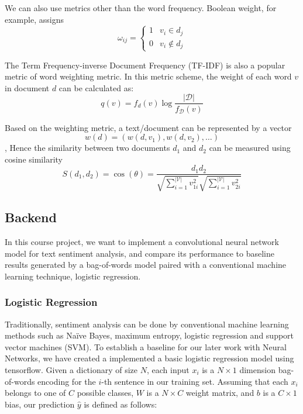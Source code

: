 \documentclass[conference]{IEEEtran}
\begin{document}
    We can also use metrics other than the word frequency. Boolean weight, for example, 
    assigns 
    $$\omega_{ij} = \begin{cases} 
        1 & v_i \in d_j\\
        0 & v_i \notin d_j
    \end{cases}$$
    
    The Term Frequency-inverse Document Frequency (TF-IDF) is also a popular metric of
    word weighting metric. In this metric scheme, the weight of each word $v$ 
    in document $d$ can be calculated as:
    $$q(v)=f_d(v)\log\frac{\left|\mathcal{D}\right|}{f_\mathcal{D}(v)}$$
    
    Based on the weighting metric, a text/document can be represented by a vector 
    $$w(d)=(w(d,v_1),w(d,v_2),\ldots)$$,
    Hence the similarity between two documents $d_1$ and $d_2$ can be measured using 
    cosine similarity\cite{salton1988term}
    $$S(d_1,d_2)=\cos(\theta)=\frac{d_1d_2}{
    \sqrt{\sum_{i=1}^{\left|\mathcal{V}\right|}{v_{1i}^2}}
    \sqrt{\sum_{i=1}^{\left|\mathcal{V}\right|}{v_{2i}^2}}
    }$$

\subsection{Backend}
\label{model:back}
    In this course project, we want to implement a convolutional neural network
    model for text sentiment analysis, and compare its performance to baseline results
    generated by a bag-of-words model paired with a conventional machine learning
    technique, logistic regression.
    
\subsubsection{Logistic Regression}
\label{model:back:lr}
    Traditionally, sentiment analysis can be done by conventional machine learning
    methods such as Na\"ive Bayes, maximum entropy, logistic regression and 
    support vector machines (SVM). 
    To establish a baseline for our later work with Neural Networks, we have
    created a implemented a basic logistic regression model using tensorflow. Given a 
    dictionary of size $N$, each input $x_i$ is a $N \times 1$ dimension bag-of-words 
    encoding for the $i$-th sentence in our training set. Assuming that each $x_i$ 
    belongs to one of $C$ possible classes, $W$ is a $N \times C$ weight matrix, 
    and $b$ is a $C \times 1$ bias, our prediction $\hat{y}$ 
    is defined as follows\cite{ng2002discriminative,hosmer2013applied}:
\end{document}
